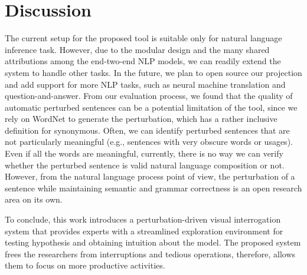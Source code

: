 \section{Discussion}
The current setup for the proposed tool is suitable only for natural language inference task. However, due to the modular design and the many shared attributions among the end-two-end NLP models, we can readily extend the system to handle other tasks. In the future, we plan to open source our projection and add support for more NLP tasks, such as neural machine translation and question-and-answer.
%
From our evaluation process, we found that the quality of automatic perturbed sentences can be a potential limitation of the tool, since we rely on WordNet to generate the perturbation, which has a rather inclusive definition for synonymous. Often, we can identify perturbed sentences that are not particularly meaningful (e.g., sentences with very obscure words or usages). 
Even if all the words are meaningful, currently, there is no way we can verify whether the perturbed sentence is valid natural language composition or not.
%
However, from the natural language process point of view, the perturbation of a sentence while maintaining semantic and grammar correctness is an open research area on its own. 

To conclude, this work introduces a perturbation-driven visual interrogation system that provides experts with a streamlined exploration environment for testing hypothesis and obtaining intuition about the model. The proposed system frees the researchers from interruptions and tedious operations, therefore, allows them to focus on more productive activities.

